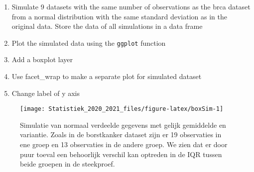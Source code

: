 \documentclass[
  12pt,dutch,coursenotes]{book}
\newenvironment{Shaded}{\begin{snugshade}}{\end{snugshade}}
\newcommand{\DataTypeTok}[1]{\textcolor[rgb]{0.13,0.29,0.53}{#1}}
\newcommand{\DecValTok}[1]{\textcolor[rgb]{0.00,0.00,0.81}{#1}}
\newcommand{\KeywordTok}[1]{\textcolor[rgb]{0.13,0.29,0.53}{\textbf{#1}}}
\newcommand{\NormalTok}[1]{#1}
\newcommand{\OperatorTok}[1]{\textcolor[rgb]{0.81,0.36,0.00}{\textbf{#1}}}
\newcommand{\StringTok}[1]{\textcolor[rgb]{0.31,0.60,0.02}{#1}}
\providecommand{\tightlist}{%
  \setlength{\itemsep}{0pt}\setlength{\parskip}{0pt}}
\theoremstyle{definition}
\theoremstyle{definition}
\theoremstyle{definition}
\theoremstyle{remark}
\begin{document}
\begin{enumerate}
\def\labelenumi{\arabic{enumi}.}
\tightlist
\item
  Simulate 9 datasets with the same number of observations as the brca dataset from a normal distribution with the same standard deviation as in the original data. Store the data of all simulations in a data frame
\item
  Plot the simulated data using the \texttt{ggplot} function
\item
  Add a boxplot layer
\item
  Use facet\_wrap to make a separate plot for simulated dataset
\item
  Change label of y axis
\end{enumerate}

\begin{Shaded}
\end{Shaded}

\begin{figure}

{\centering \texttt{[image: Statistiek\_2020\_2021\_files/figure-latex/boxSim-1]} 

}

\caption{Simulatie van normaal verdeelde gegevens met gelijk gemiddelde en variantie. Zoals in de borstkanker dataset zijn er 19 observaties in ene groep en 13 observaties in de andere groep. We zien dat er door puur toeval een behoorlijk verschil kan optreden in de IQR tussen beide groepen in de steekproef.}\label{fig:boxSim}
\end{figure}
\end{document}
